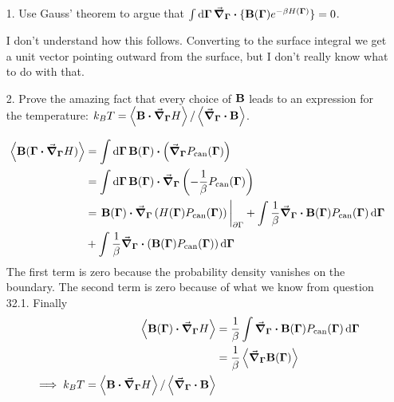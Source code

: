 \documentclass[a4paper,twoside]{article}
\begin{document}
\begin{itemize}
    \item[1.] Use Gauss' theorem to argue that $ \int \dd{\vb{\Gamma}} \grad_{\vb{\Gamma}} \vdot \{\vb{B}(\vb{\Gamma}) e^{- \beta H(\vb{\Gamma})}\} = 0 $.
        \begin{problem}
            I don't understand how this follows. Converting to the surface integral we get a unit vector pointing outward from the surface, but I don't really know what to do with that.
        \end{problem}
    \item[2.] Prove the amazing fact that every choice of $ \vb{B} $ leads to an expression for the temperature: $ k_B T = \ev{\vb{B} \vdot \grad_{\vb{\Gamma}} H} / \ev{\grad_{\vb{\Gamma}} \vdot \vb{B}} $.
        \begin{problem}
            \begin{align}
                \ev{\vb{B}(\vb{\Gamma} \vdot \grad_{\vb{\Gamma}}H)} &= \int \dd{\vb{\Gamma}} \vb{B}(\vb{\Gamma}) \vdot \left( \grad_{\vb{\Gamma}} P_{\text{can}}(\vb{\Gamma}) \right)\\
                &= \int \dd{\vb{\Gamma}} \vb{B}(\vb{\Gamma}) \vdot \grad_{\vb{\Gamma}} \left( - \frac{1}{\beta} P_{\text{can}}(\vb{\Gamma}) \right) \\
                &= \eval{\vb{B}(\vb{\Gamma}) \vdot \grad_{\vb{\Gamma}} \left( H(\vb{\Gamma}) P_{\text{can}}(\vb{\Gamma}) \right)}_{\partial\Gamma} + \int \frac{1}{\beta} \grad_{\vb{\Gamma}} \vdot \vb{B}(\vb{\Gamma}) P_{\text{can}}(\vb{\Gamma}) \dd{\vb{\Gamma}} \\ &+ \int \frac{1}{\beta} \grad_{\vb{\Gamma}} \vdot \left( \vb{B}(\vb{\Gamma}) P_{\text{can}}(\vb{\Gamma}) \right) \dd{\vb{\Gamma}} 
            \end{align}
            The first term is zero because the probability density vanishes on the boundary. The second term is zero because of what we know from question 32.1. Finally
            \begin{align}
                \ev{\vb{B}(\vb{\Gamma}) \vdot \grad_{\vb{\Gamma}} H} &= \frac{1}{\beta} \int \grad_{\vb{\Gamma}} \vdot \vb{B}(\vb{\Gamma}) P_{\text{can}}(\vb{\Gamma}) \dd{\vb{\Gamma}} \\
                &= \frac{1}{\beta} \ev{\grad_{\vb{\Gamma}} \vb{B}(\vb{\Gamma})} \\
                \implies k_B T = \ev{\vb{B} \vdot \grad_{\vb{\Gamma}} H} / \ev{\grad_{\vb{\Gamma}} \vdot \vb{B}}
            \end{align}

\end{problem}
\end{itemize}
\end{document}

